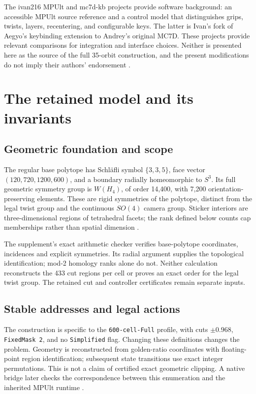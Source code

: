 \documentclass[a4paper,11pt]{article}
\begin{document}
The ivan216 MPUlt and mc7d-kb projects provide software background: an accessible MPUlt source reference and a control model that distinguishes grips, twists, layers, recentering, and configurable keys. The latter is Ivan's fork of Aegyo's keybinding extension to Andrey's original MC7D. These projects provide relevant comparisons for integration and interface choices. Neither is presented here as the source of the full 35-orbit construction, and the present modifications do not imply their authors' endorsement \cite{mpultfork,mc7dkb}.

\section{The retained model and its invariants}
\label{sec:3}

\subsection{Geometric foundation and scope}

The regular base polytope has Schl\"afli symbol \(\{3,3,5\}\), face vector \((120,720,1200,600)\), and a boundary radially homeomorphic to \(S^3\). Its full geometric symmetry group is \(W(H_4)\), of order 14,400, with 7,200 orientation-preserving elements. These are rigid symmetries of the polytope, distinct from the legal twist group and the continuous \(SO(4)\) camera group. Sticker interiors are three-dimensional regions of tetrahedral facets; the rank defined below counts cap memberships rather than spatial dimension \cite{puzzletheory}.

The supplement's exact arithmetic checker verifies base-polytope coordinates, incidences and explicit symmetries. Its radial argument supplies the topological identification; mod-2 homology ranks alone do not. Neither calculation reconstructs the 433 cut regions per cell or proves an exact order for the legal twist group. The retained cut and controller certificates remain separate inputs.

\subsection{Stable addresses and legal actions}

The construction is specific to the \texttt{600-cell-Full} profile, with cuts \(\pm0.968\), \texttt{FixedMask 2}, and no \texttt{Simplified} flag. Changing these definitions changes the problem. Geometry is reconstructed from golden-ratio coordinates with floating-point region identification; subsequent state transitions use exact integer permutations. This is not a claim of certified exact geometric clipping. A native bridge later checks the correspondence between this enumeration and the inherited MPUlt runtime \cite{transcript,algorithms,validation}.
\end{document}
